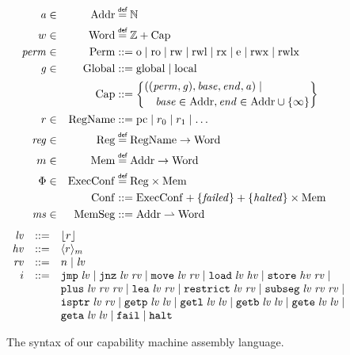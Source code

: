 \documentclass[compsoc,conference,letterpaper,fleqn]{IEEEtran}
\newcommand{\parfun}{\rightharpoonup}
\newcommand{\var}[1]{\mathit{#1}}
\newcommand{\hs}{\var{ms}}
\newcommand{\ms}{\hs}
\newcommand{\hv}{\var{hv}}
\newcommand{\rv}{\var{rv}}
\newcommand{\lv}{\var{lv}}
\newcommand{\gl}{\var{g}}
\newcommand{\pcreg}{\mathrm{pc}}
\newcommand{\addr}{\var{a}}
\newcommand{\start}{\var{base}}
\newcommand{\addrend}{\var{end}}
\newcommand{\reg}{\var{reg}}
\newcommand{\perm}{\var{perm}}
\newcommand{\failed}{\mathit{failed}}
\newcommand{\halted}{\mathit{halted}}
\newcommand{\plaindom}[1]{\mathrm{#1}}
\newcommand{\Caps}{\plaindom{Cap}}
\newcommand{\Words}{\plaindom{Word}}
\newcommand{\Addrs}{\plaindom{Addr}}
\newcommand{\ExecConfs}{\plaindom{ExecConf}}
\newcommand{\RegName}{\plaindom{RegName}}
\newcommand{\Regs}{\plaindom{Reg}}
\newcommand{\Heaps}{\plaindom{Mem}}
\newcommand{\HeapSegments}{\plaindom{MemSeg}}
\newcommand{\MemSegments}{\HeapSegments}
\newcommand{\Confs}{\plaindom{Conf}}
\newcommand{\nats}{\mathbb{N}}
\newcommand{\ints}{\mathbb{Z}}
\newcommand{\Perms}{\plaindom{Perm}}
\newcommand{\Globals}{\plaindom{Global}}
\newcommand{\refreg}[1]{\lfloor #1 \rfloor}
\newcommand{\refheap}[1]{\langle #1 \rangle_m}
\newcommand{\zinstr}[1]{\mathtt{#1}}
\newcommand{\fail}{\zinstr{fail}}
\newcommand{\halt}{\zinstr{halt}}
\newcommand{\oneinstr}[2]{
  \ifthenelse{\equal{#2}{}}
  {\zinstr{#1}}
  {\zinstr{#1} \; #2}
}
\newcommand{\jmp}[1]{\oneinstr{jmp}{#1}}
\newcommand{\twoinstr}[3]{
  \ifthenelse{\equal{#2#3}{}}
  {\zinstr{#1}}
  {\zinstr{#1} \; #2 \; #3}
}
\newcommand{\restricttwo}[2]{\twoinstr{restrict}{#1}{#2}}
\newcommand{\jnz}[2]{\twoinstr{jnz}{#1}{#2}}
\newcommand{\isptr}[2]{\twoinstr{isptr}{#1}{#2}}
\newcommand{\geta}[2]{\twoinstr{geta}{#1}{#2}}
\newcommand{\getb}[2]{\twoinstr{getb}{#1}{#2}}
\newcommand{\gete}[2]{\twoinstr{gete}{#1}{#2}}
\newcommand{\getp}[2]{\twoinstr{getp}{#1}{#2}}
\newcommand{\getl}[2]{\twoinstr{getl}{#1}{#2}}
\newcommand{\move}[2]{\twoinstr{move}{#1}{#2}}
\newcommand{\store}[2]{\twoinstr{store}{#1}{#2}}
\newcommand{\load}[2]{\twoinstr{load}{#1}{#2}}
\newcommand{\lea}[2]{\twoinstr{lea}{#1}{#2}}
\newcommand{\threeinstr}[4]{
  \ifthenelse{\equal{#2#3#4}{}}
  {\zinstr{#1}}
  {\zinstr{#1} \; #2 \; #3 \; #4}
}
\newcommand{\subseg}[3]{\threeinstr{subseg}{#1}{#2}{#3}}
\newcommand{\plus}[3]{\threeinstr{plus}{#1}{#2}{#3}}
\newcommand{\plainperm}[1]{\mathrm{#1}}
\newcommand{\noperm}{\plainperm{o}}
\newcommand{\readonly}{\plainperm{ro}}
\newcommand{\readwrite}{\plainperm{rw}}
\newcommand{\exec}{\plainperm{rx}}
\newcommand{\entry}{\plainperm{e}}
\newcommand{\rwx}{\plainperm{rwx}}
\newcommand{\readwritel}{\plainperm{rwl}}
\newcommand{\rwlx}{\plainperm{rwlx}}
\newcommand{\local}{\plainperm{local}}
\newcommand{\glob}{\plainperm{global}}
\newcommand{\isdef}{\mathrel{\overset{\makebox[0pt]{\mbox{\normalfont\tiny\sffamily def}}}{=}}}
\newcommand\bnfdef{\mathrel{::=}}
\begin{document}
\begin{figure}
  \begin{align*}
    \addr   &\in& \Addrs &\isdef \nats\\
    w &\in&\Words &\isdef \ints + \Caps \\
    \perm   &\in& \Perms &::= \noperm \mid \readonly\mid \readwrite\mid \readwritel\mid \exec\mid \entry\mid \rwx\mid \rwlx\\
    \gl&\in&\Globals & ::= \glob \mid \local \\
     && \Caps  &::= \left\{
                       \begin{multlined}
                         ((\perm,\gl),\start,\addrend,\addr)\mid\\
                         \start\in\Addrs,\addrend \in
                         \Addrs\cup \{\infty\}
                       \end{multlined} \right\}\\
    r       &\in& \RegName&\bnfdef \pcreg\mid r_0\mid r_1\mid\ldots\\
    \reg &\in& \Regs  &\isdef \RegName \rightarrow \Words\\
    m&\in& \Heaps &\isdef \Addrs \rightarrow \Words \\
    \Phi    &\in& \ExecConfs  &\isdef \Regs \times \Heaps \\
    &&\Confs &::= \ExecConfs + \{\failed \} + \{\halted\} \times \Heaps \\
    \ms     &\in& \MemSegments &::= \Addrs \parfun \Words
  \end{align*}
  \begin{equation*}
  \begin{array}{rcl}
    \lv    &::=& \refreg{r} \\
    \hv    &::=& \refheap{r}\\
    \rv    &::=& n \mid \lv \\
    i      &::=& 
                 \jmp{\lv} \mid 
                 \jnz{\lv}{\rv} \mid
                 \move{\lv}{\rv} \mid 
                 \load{\lv}{\hv} \mid 
                 \store{\hv}{\rv} \mid  \\
           &   & \plus{\lv}{\rv}{\rv} \mid 
                 \lea{\lv}{\rv} \mid 
                 \restricttwo{\lv}{\rv} \mid 
                 \subseg{\lv}{\rv}{\rv} \mid  \\
           &   & \isptr{\lv}{\rv} \mid 
                 \getp{\lv}{\lv} \mid 
                 \getl{\lv}{\lv} \mid 
                 \getb{\lv}{\lv} \mid
                 \gete{\lv}{\lv} \mid\\
           &   & \geta{\lv}{\lv} \mid 
                 \fail \mid
                 \halt 
  \end{array}
\end{equation*}
  \caption{The syntax of our capability machine assembly language.}
  \label{fig:syntax}
\end{figure}
\end{document}
